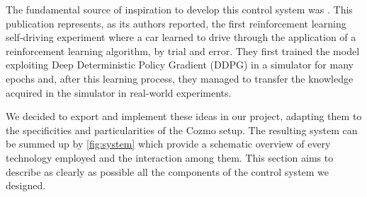 The fundamental source of inspiration to develop this control system was \cite{kendall2018learning,kendall2019learning}. This publication represents, as its authors reported,  the first reinforcement learning self-driving experiment where a car learned to drive through the application of a reinforcement learning algorithm, by trial and error. They first trained the model exploiting Deep Deterministic Policy Gradient (DDPG) in a simulator for many epochs and, after this learning process, they managed to transfer the knowledge acquired in the simulator in real-world experiments.

We decided to export and implement these ideas in our project, adapting them to the specificities and particularities of the Cozmo setup. The resulting system can be summed up by \vref{fig:system} which provide a schematic overview of every technology employed and the interaction among them.
This section aims to describe as clearly as possible all the components of the control system we designed.


